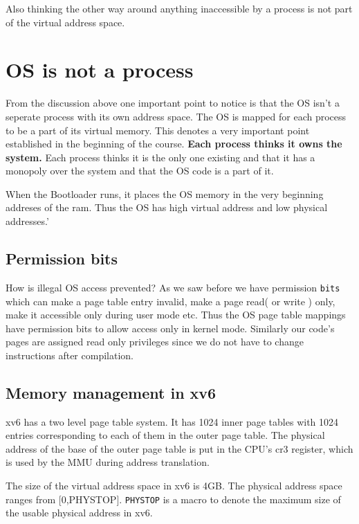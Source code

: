 \documentclass[12pt]{article}
\begin{document}
Also thinking the other way around anything inaccessible by a process is not part of the virtual address space. 

\section{OS is not a process}
From the discussion above one important point to notice is that the OS isn't a seperate process with its own address space. The OS is mapped for each process to be a part of its virtual memory.
This denotes a very important point established in the beginning of the course. \textbf{Each process thinks it owns the system.} Each process thinks it is the only one existing and that
it has a monopoly over the system and that the OS code is a part of it.

When the Bootloader runs, it places the OS memory in the very beginning addreses of the ram. Thus the OS has high virtual address and low physical addresses.'

\subsection{Permission bits}
\label{section:Permission bits}
How is illegal OS access prevented? As we saw before we have permission \texttt{bits} which can make a page table entry invalid, make a page read( or write ) only, make it accessible only during user mode etc. 
Thus the OS page table mappings have permission bits to allow access only in kernel mode. Similarly our code's pages are assigned read only privileges since we do not have to change instructions after compilation. 

\subsection{Memory management in xv6}
xv6 has a two level page table system. It has 1024 inner page tables with 1024 entries corresponding to each of them in the 
outer page table. The physical address of the base of the outer page table is put in the CPU's cr3 register, which is used by the MMU
during address translation.

The size of the virtual address space in xv6 is 4GB. The physical address space ranges from [0,PHYSTOP]. \texttt{PHYSTOP} is a macro to denote
the maximum size of the usable physical address in xv6.
\end{document}
